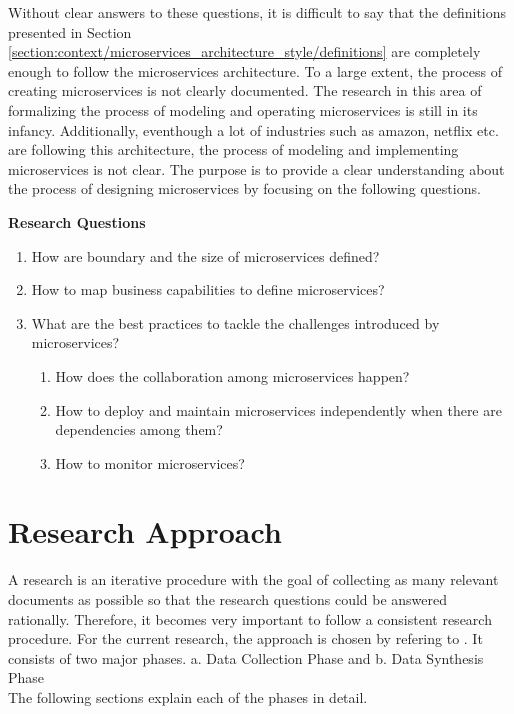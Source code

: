 Without clear answers to these questions, it is difficult to say that the definitions presented in Section \ref{section:context/microservices_architecture_style/definitions} are completely enough to follow the microservices architecture. To a large extent, the process of creating microservices is not clearly documented. The research in this area of formalizing the process of modeling and operating microservices is still in its infancy. Additionally, eventhough a lot of industries such as amazon, netflix etc. are following this architecture, the process of modeling and implementing microservices is not clear. The purpose is to provide a clear understanding about the process of designing microservices by focusing on the following questions.
\begin{shaded}
\textbf{Research Questions}\label{list:introduction/research_questions}
\end{shaded}
\begin{enumerate}
\item How are boundary and the size of microservices defined?
\item How to map business capabilities to define microservices?
\item What are the best practices to tackle the challenges introduced by microservices?
    \begin{enumerate}
    \item How does the collaboration among microservices happen?
    \item How to deploy and maintain microservices independently when there are dependencies among them?
    \item How to monitor microservices?
    \end{enumerate}
\end{enumerate}
\section{Research Approach}\label{section:context/approach}
A research is an iterative procedure with the goal of collecting as many relevant documents as possible so that the research questions could be answered rationally. Therefore, it becomes very important to follow a consistent research procedure. For the current research, the approach is chosen by refering to \cite{np:2007aa}. It consists of two major phases.
a. {Data Collection Phase} and 
b. {Data Synthesis Phase}
\\
The following sections explain each of the phases in detail.
